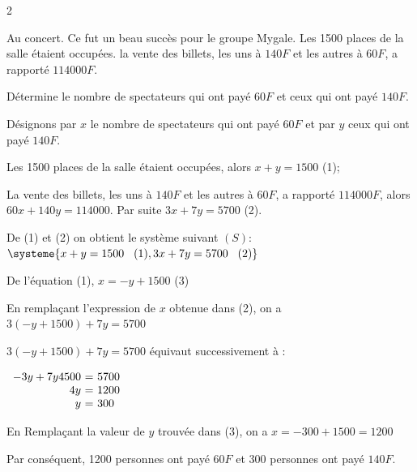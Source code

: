 \begin{multicols*}{2}
  	
  	Au concert. Ce fut un beau succès pour le groupe Mygale. Les 1500 places de la salle étaient occupées. la vente des billets, les uns à $140 F$ et les autres à $60 F$, a rapporté $114 000 F$.
  	
  	Détermine le nombre de spectateurs qui ont payé $60F$ et ceux qui ont payé $140F$.
  	
  	\dure
  	\resul
  	Désignons par $x$ le nombre de spectateurs qui ont payé  $60F$ et par $y$ ceux qui ont payé $140F$.
  	
  	 Les 1500 places de la salle étaient occupées, alors $x+y=1500$ (1);
  	
  	 La vente des billets, les uns à $140 F$ et les autres à $60 F$, a rapporté $114 000 F$, alors $60x+140y=114000$. Par suite $3x+7y=5700$ (2).
  	
  	De (1) et (2) on obtient le système suivant $(S)$: $\systeme{x+y=1500 \hspace{0.3cm} (1), 3x+7y=5700 \hspace{0.3cm} (2)}$
  	
  	De l'équation (1), $x=-y+1500$ (3)
  	
  	En remplaçant l'expression de $x$ obtenue dans (2), on a $3(-y+1500)+7y=5700$
  	
  	$3(-y+1500)+7y=5700$  équivaut successivement à :
  	
  	$\begin{array}{r@{\ =\ }l} 
  		-3y+7y 4500&5700\\
  		4y	& 1200 \\ 	
  		y	&300 \\ 
  	\end{array}$ 
  	
  	En Remplaçant la valeur de $y$ trouvée dans (3), on a $x=-300+1500=1200$
  	
  	Par conséquent, 1200 personnes ont payé $60F$ et 300 personnes ont payé $140F$.
\end{multicols*}
